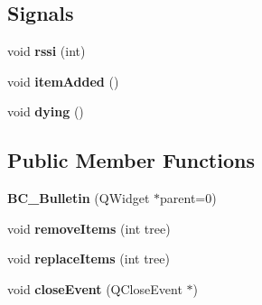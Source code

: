 \subsection*{Signals}
\begin{DoxyCompactItemize}
\item 
void {\bfseries rssi} (int)\hypertarget{class_b_c___bulletin_a1d5d9d5d4ff0f3c92c3ecc1984710961}{}\label{class_b_c___bulletin_a1d5d9d5d4ff0f3c92c3ecc1984710961}

\item 
void {\bfseries item\+Added} ()\hypertarget{class_b_c___bulletin_a45931b7da29f76b4ffe08828d1d81580}{}\label{class_b_c___bulletin_a45931b7da29f76b4ffe08828d1d81580}

\item 
void {\bfseries dying} ()\hypertarget{class_b_c___bulletin_a560ed1f975f659188cdc4c98f5f96773}{}\label{class_b_c___bulletin_a560ed1f975f659188cdc4c98f5f96773}

\end{DoxyCompactItemize}
\subsection*{Public Member Functions}
\begin{DoxyCompactItemize}
\item 
{\bfseries B\+C\+\_\+\+Bulletin} (Q\+Widget $\ast$parent=0)\hypertarget{class_b_c___bulletin_a41ae9ac01a108f7bf4b6aba315d5e4b0}{}\label{class_b_c___bulletin_a41ae9ac01a108f7bf4b6aba315d5e4b0}

\item 
void {\bfseries remove\+Items} (int tree)\hypertarget{class_b_c___bulletin_ac82707f3d09a5e14d9f33564e751f05b}{}\label{class_b_c___bulletin_ac82707f3d09a5e14d9f33564e751f05b}

\item 
void {\bfseries replace\+Items} (int tree)\hypertarget{class_b_c___bulletin_a2a473cbef765f03ff0a2d60b434cd06b}{}\label{class_b_c___bulletin_a2a473cbef765f03ff0a2d60b434cd06b}

\item 
void {\bfseries close\+Event} (Q\+Close\+Event $\ast$)\hypertarget{class_b_c___bulletin_a7d8e89a713031ae32986c1fa6a05ee44}{}\label{class_b_c___bulletin_a7d8e89a713031ae32986c1fa6a05ee44}

\end{DoxyCompactItemize}
